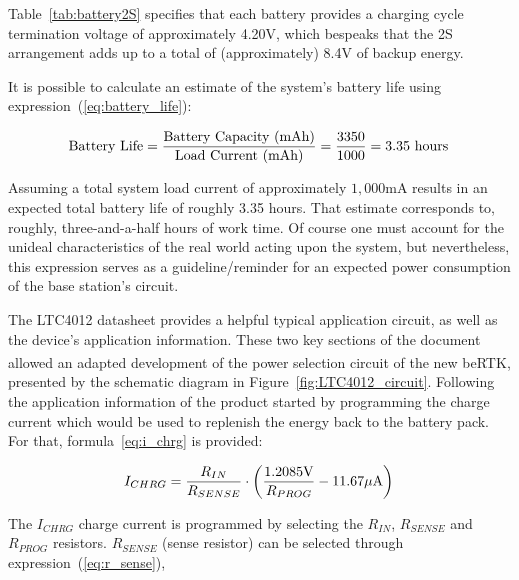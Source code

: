 Table~\ref{tab:battery2S} specifies that each battery provides a charging cycle termination voltage of approximately 4.20V, which bespeaks that the 2S arrangement adds up to a total of (approximately) 8.4V of backup energy.

It is possible to calculate an estimate of the system's battery life using expression~(\ref{eq:battery_life}):

\begin{equation}\label{eq:battery_life}
    \textrm{Battery Life} = \frac{\textrm{Battery Capacity (mAh)}}{\textrm{Load Current (mAh)}} = \frac{3350}{1000} = 3.35 \textrm{ hours}\,\medskip
\end{equation}

\noindent Assuming a total system load current of approximately $1,000$mA results in an expected total battery life of roughly 3.35 hours. That estimate corresponds to, roughly, three-and-a-half hours of work time. Of course one must account for the unideal characteristics of the real world acting upon the system, but nevertheless, this expression serves as a guideline/reminder for an expected power consumption of the base station's circuit. 

The LTC4012 datasheet provides a helpful typical application circuit, as well as the device's application information. These two key sections of the document allowed an adapted development of the power selection circuit of the new beRTK\textsuperscript{\textregistered}, presented by the schematic diagram in Figure~\ref{fig:LTC4012_circuit}. Following the application information of the product started by programming the charge current which would be used to replenish the energy back to the battery pack. For that, formula~\ref{eq:i_chrg} is provided:

\begin{equation}\label{eq:i_chrg}
    I_{CHRG}=\frac{R_{IN}}{R_{SENSE}} \cdot \left(\frac{1.2085\textrm{V}}{R_{PROG}}-11.67\mu\textrm{A}\right)\,\medskip
\end{equation}

\noindent The $I_{CHRG}$ charge current is programmed by selecting the $R_{IN}$, $R_{SENSE}$ and $R_{PROG}$ resistors. $R_{SENSE}$ (sense resistor) can be selected through expression~(\ref{eq:r_sense}),

